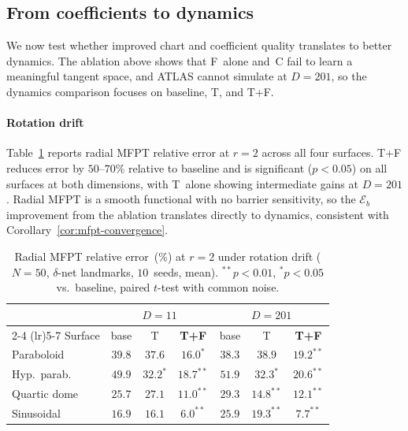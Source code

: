 \documentclass[11pt]{article}
\newcommand{\cE}{\mathcal{E}}
\begin{document}
\subsection{From coefficients to dynamics}\label{ssec:mfpt}\label{ssec:mb_mfpt}\label{ssec:radial_mfpt}

We now test whether improved chart and coefficient
quality translates to better dynamics.
The ablation above shows that F~alone and~C fail to
learn a meaningful tangent space, and ATLAS cannot
simulate at $D{=}201$, so the dynamics
comparison focuses on baseline, T, and T+F.

\paragraph{Rotation drift}
Table~\ref{tab:rotation_mfpt} reports radial MFPT
relative error at $r{=}2$ across all four surfaces.
T+F reduces error by $50$--$70\%$ relative to baseline
and is significant ($p{<}0.05$) on all surfaces at both
dimensions, with T~alone showing intermediate gains at
$D{=}201$.
Radial MFPT is a smooth functional with no barrier
sensitivity, so the $\cE_b$ improvement from the
ablation translates directly to dynamics, consistent
with Corollary~\ref{cor:mfpt-convergence}.

\begin{table}[ht]
\centering
\caption{Radial MFPT relative error~(\%) at $r{=}2$
under rotation drift ($N{=}50$, $\delta$-net landmarks,
$10$~seeds, mean).
${}^{**}p{<}0.01$, ${}^{*}p{<}0.05$ vs.\ baseline,
paired $t$-test with common noise.}
\label{tab:rotation_mfpt}
\small
\begin{tabular}{l ccc ccc}
\toprule
 & \multicolumn{3}{c}{$D{=}11$} & \multicolumn{3}{c}{$D{=}201$} \\
\cmidrule(lr){2-4} \cmidrule(lr){5-7}
Surface & base & T & \textbf{T+F} & base & T & \textbf{T+F} \\
\midrule
Paraboloid   & $39.8$ & $37.6$ & $\mathbf{16.0}^{*}$
             & $38.3$ & $38.9$ & $\mathbf{19.2}^{**}$ \\
Hyp.\ parab. & $49.9$ & $32.2^{*}$ & $\mathbf{18.7}^{**}$
             & $51.9$ & $32.3^{*}$ & $\mathbf{20.6}^{**}$ \\
Quartic dome & $25.7$ & $27.1$ & $\mathbf{11.0}^{**}$
             & $29.3$ & $14.8^{**}$ & $\mathbf{12.1}^{**}$ \\
Sinusoidal   & $16.9$ & $16.1$ & $\mathbf{6.0}^{**}$
             & $25.9$ & $19.3^{**}$ & $\mathbf{7.7}^{**}$ \\
\bottomrule
\end{tabular}
\end{table}
\end{document}
